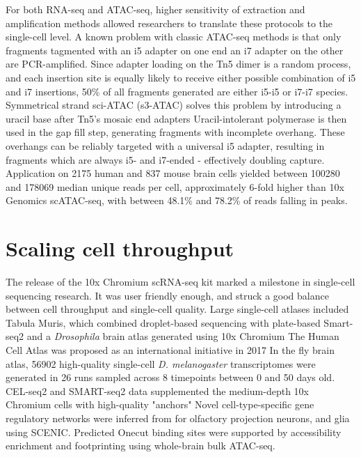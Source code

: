 For both RNA-seq and ATAC-seq, higher sensitivity of extraction and amplification methods allowed researchers to translate these protocols to the single-cell level. A known problem with classic ATAC-seq methods is that only fragments tagmented with an i5 adapter on one end an i7 adapter on the other are PCR-amplified. Since adapter loading on the Tn5 dimer is a random process, and each insertion site is equally likely to receive either possible combination of i5 and i7 insertions, 50\% of all fragments generated are either i5-i5 or i7-i7 species. Symmetrical strand sci-ATAC (s3-ATAC) solves this problem by introducing a uracil base after Tn5's mosaic end adapters Uracil-intolerant polymerase is then used in the gap fill step, generating fragments with incomplete overhang. These overhangs can be reliably targeted with a universal i5 adapter, resulting in fragments which are always i5- and i7-ended - effectively doubling capture. Application on \num{2175} human and \num{837} mouse brain cells yielded between \num{100280} and \num{178069} median unique reads per cell, approximately 6-fold higher than 10x Genomics scATAC-seq, with between 48.1\% and 78.2\% of reads falling in peaks.

\section{Scaling cell throughput}
The release of the 10x Chromium scRNA-seq kit marked a milestone in single-cell sequencing research. It was user friendly enough, and struck a good balance between cell throughput and single-cell quality. Large single-cell atlases included Tabula Muris, which combined droplet-based sequencing with plate-based Smart-seq2 and a \textit{Drosophila} brain atlas generated using 10x Chromium The Human Cell Atlas was proposed as an international initiative in 2017 In the fly brain atlas, \num{56902} high-quality single-cell \textit{D. melanogaster} transcriptomes were generated in 26 runs sampled across 8 timepoints between 0 and 50 days old. CEL-seq2 and SMART-seq2 data supplemented the medium-depth 10x Chromium cells with high-quality "anchors" Novel cell-type-specific gene regulatory networks were inferred from for olfactory projection neurons, and glia using SCENIC. Predicted Onecut binding sites were supported by accessibility enrichment and footprinting using whole-brain bulk ATAC-seq.

